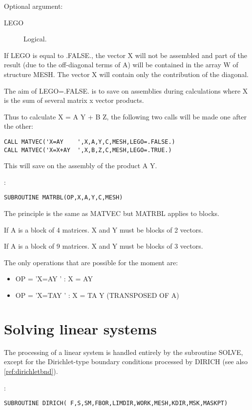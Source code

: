 Optional argument:
\begin{description}
  \item [LEGO] Logical.
\end{description}

If LEGO is equal to .FALSE., the vector X will not be assembled and part of the
result (due to the off-diagonal terms of A) will be contained in the array W of
structure MESH. The vector X will contain only the contribution of the
diagonal.

The aim of LEGO=.FALSE. is to save on assemblies during calculations where X is
the sum of several matrix x vector products.

Thus to calculate X = A Y + B Z, the following two calls will be made one after
the other:

\begin{lstlisting}[language=TelFortran]
CALL MATVEC('X=AY    ',X,A,Y,C,MESH,LEGO=.FALSE.)
CALL MATVEC('X=X+AY  ',X,B,Z,C,MESH,LEGO=.TRUE.)
\end{lstlisting}

This will save on the assembly of the product A Y.

:
\begin{lstlisting}[language=TelFortran]
SUBROUTINE MATRBL(OP,X,A,Y,C,MESH)
\end{lstlisting}

The principle is the same as MATVEC but MATRBL applies to blocks.

If A is a block of 4 matrices. X and Y must be blocks of 2 vectors.

If A is a block of 9 matrices. X and Y must be blocks of 3 vectors.

The only operations that are possible for the moment are:
\begin{itemize}
  \item OP = 'X=AY    '  : X = AY
  \item OP = 'X=TAY   '  : X = TA Y (TRANSPOSED OF A)
\end{itemize}

\section{Solving linear systems}

The processing of a linear system is handled entirely by the subroutine SOLVE,
except for the Dirichlet-type boundary conditions processed by DIRICH (see also
\ref{ref:dirichletbnd}).

:
\begin{lstlisting}[language=TelFortran]
SUBROUTINE DIRICH( F,S,SM,FBOR,LIMDIR,WORK,MESH,KDIR,MSK,MASKPT)
\end{lstlisting}

